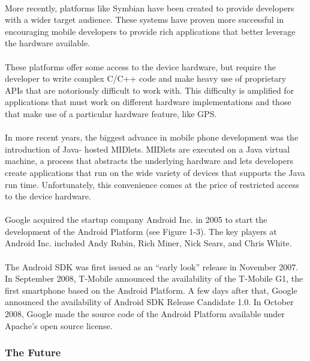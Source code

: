 \paragraph{}
More recently, platforms like Symbian have been created to provide developers with a wider target
audience. These systems have proven more successful in encouraging mobile developers to provide rich
applications that better leverage the hardware available.
\paragraph{}
These platforms offer some access to the device hardware, but require the developer to write complex
C/C++ code and make heavy use of proprietary APIs that are notoriously difficult to work with. This
difficulty is amplified for applications that must work on different hardware implementations and those
that make use of a particular hardware feature, like GPS.
\paragraph{}
In more recent years, the biggest advance in mobile phone development was the introduction of Java-
hosted MIDlets. MIDlets are executed on a Java virtual machine, a process that abstracts the underlying
hardware and lets developers create applications that run on the wide variety of devices that supports
the Java run time. Unfortunately, this convenience comes at the price of restricted access to the device
hardware.
\paragraph{}
Google acquired the startup company Android Inc. in 2005 to start the development of the
Android Platform (see Figure 1-3). The key players at Android Inc. included Andy Rubin, Rich
Miner, Nick Sears, and Chris White.
\paragraph{}
The Android SDK was first issued as an “early look” release in November 2007. In September 2008, 
T-Mobile announced the availability of the T-Mobile G1, the first smartphone based
on the Android Platform. A few days after that, Google announced the availability of Android
SDK Release Candidate 1.0. In October 2008, Google made the source code of the Android
Platform available under Apache’s open source license.

\subsubsection{The Future}

